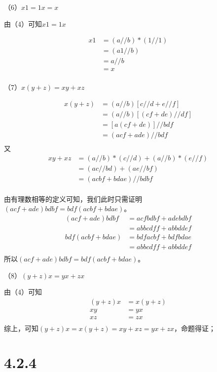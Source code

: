 \documentclass{article}
\theoremstyle{mystyle}
\begin{document}
（6）$x1 = 1x = x$

由（4）可知$x1 = 1x$

\begin{align*}
  x1 & = (a//b) * (1//1) \\
     & = (a1//b)         \\
     & = a//b            \\
     & = x               \\
\end{align*}

（7）$x(y+z) = xy + xz$

\begin{align*}
  x(y+z) & = (a // b)[c // d + e // f] \\
         & = (a // b)[(cf + de) // df] \\
         & = [a(cf + de)] // bdf       \\
         & = (acf + ade) // bdf        \\
\end{align*}
又
\begin{align*}
  xy + xz & = (a//b) * (c//d) + (a//b) * (e//f) \\
          & = (ac // bd) + (ae // bf)           \\
          & = (acbf + bdae) // bdbf             \\
\end{align*}

由有理数相等的定义可知，我们此时只需证明
$(acf + ade)bdbf = bdf(acbf + bdae)$。
\begin{align*}
  (acf + ade)bdbf  & = acfbdbf + adebdbf \\
                   & = abbcdff + abbddef \\
  bdf(acbf + bdae) & = bdfacbf + bdfbdae \\
                   & = abbcdff + abbddef \\
\end{align*}
所以$(acf + ade)bdbf = bdf(acbf + bdae)$。

（8）$(y+z)x = yx + zx$

由（4）可知
\begin{align*}
  (y+z)x & = x(y+z) \\
  xy     & = yx     \\
  xz     & = zx     \\
\end{align*}
综上，可知$(y+z)x=x(y+z)=xy+xz=yx+zx$，命题得证；

\section*{4.2.4}
\end{document}

